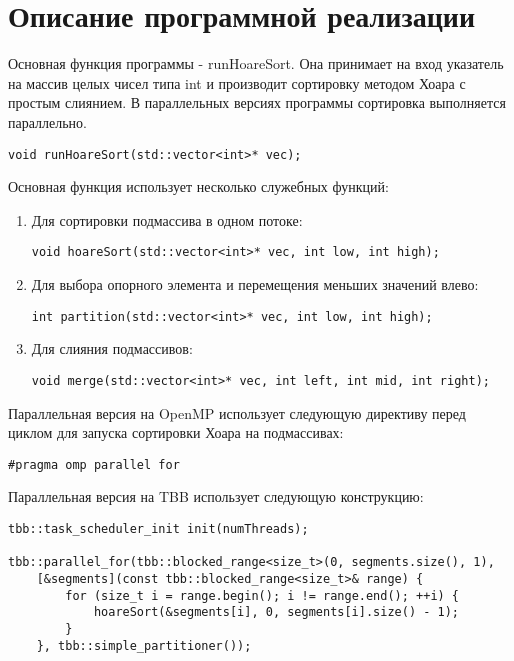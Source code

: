 \documentclass{report}
\begin{document}
\section*{Описание программной реализации}

Основная функция программы - runHoareSort. Она принимает на вход указатель на массив целых чисел типа int и производит сортировку методом Хоара с простым слиянием. В параллельных версиях программы сортировка выполняется параллельно.
\begin{lstlisting}
void runHoareSort(std::vector<int>* vec);
\end{lstlisting}

\par Основная функция использует несколько служебных функций:
\begin{enumerate}
\item Для сортировки подмассива в одном потоке:
\begin{lstlisting}
void hoareSort(std::vector<int>* vec, int low, int high);
\end{lstlisting}
\item Для выбора опорного элемента и перемещения меньших значений влево:
\begin{lstlisting}
int partition(std::vector<int>* vec, int low, int high);
\end{lstlisting}
\item Для слияния подмассивов:
\begin{lstlisting}
void merge(std::vector<int>* vec, int left, int mid, int right);
\end{lstlisting}
\end{enumerate}

\par Параллельная версия на OpenMP использует следующую директиву перед циклом для запуска сортировки Хоара на подмассивах:
\begin{lstlisting}
#pragma omp parallel for
\end{lstlisting}

\par Параллельная версия на TBB использует следующую конструкцию:
\begin{lstlisting}
tbb::task_scheduler_init init(numThreads);

tbb::parallel_for(tbb::blocked_range<size_t>(0, segments.size(), 1),
    [&segments](const tbb::blocked_range<size_t>& range) {
        for (size_t i = range.begin(); i != range.end(); ++i) {
            hoareSort(&segments[i], 0, segments[i].size() - 1);
        }
    }, tbb::simple_partitioner());
\end{lstlisting}
\end{document}
